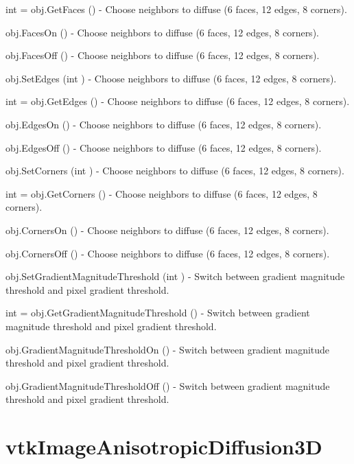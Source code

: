 \begin{DoxyItemize}
\item {\ttfamily int = obj.\-Get\-Faces ()} -\/ Choose neighbors to diffuse (6 faces, 12 edges, 8 corners).  
\item {\ttfamily obj.\-Faces\-On ()} -\/ Choose neighbors to diffuse (6 faces, 12 edges, 8 corners).  
\item {\ttfamily obj.\-Faces\-Off ()} -\/ Choose neighbors to diffuse (6 faces, 12 edges, 8 corners).  
\item {\ttfamily obj.\-Set\-Edges (int )} -\/ Choose neighbors to diffuse (6 faces, 12 edges, 8 corners).  
\item {\ttfamily int = obj.\-Get\-Edges ()} -\/ Choose neighbors to diffuse (6 faces, 12 edges, 8 corners).  
\item {\ttfamily obj.\-Edges\-On ()} -\/ Choose neighbors to diffuse (6 faces, 12 edges, 8 corners).  
\item {\ttfamily obj.\-Edges\-Off ()} -\/ Choose neighbors to diffuse (6 faces, 12 edges, 8 corners).  
\item {\ttfamily obj.\-Set\-Corners (int )} -\/ Choose neighbors to diffuse (6 faces, 12 edges, 8 corners).  
\item {\ttfamily int = obj.\-Get\-Corners ()} -\/ Choose neighbors to diffuse (6 faces, 12 edges, 8 corners).  
\item {\ttfamily obj.\-Corners\-On ()} -\/ Choose neighbors to diffuse (6 faces, 12 edges, 8 corners).  
\item {\ttfamily obj.\-Corners\-Off ()} -\/ Choose neighbors to diffuse (6 faces, 12 edges, 8 corners).  
\item {\ttfamily obj.\-Set\-Gradient\-Magnitude\-Threshold (int )} -\/ Switch between gradient magnitude threshold and pixel gradient threshold.  
\item {\ttfamily int = obj.\-Get\-Gradient\-Magnitude\-Threshold ()} -\/ Switch between gradient magnitude threshold and pixel gradient threshold.  
\item {\ttfamily obj.\-Gradient\-Magnitude\-Threshold\-On ()} -\/ Switch between gradient magnitude threshold and pixel gradient threshold.  
\item {\ttfamily obj.\-Gradient\-Magnitude\-Threshold\-Off ()} -\/ Switch between gradient magnitude threshold and pixel gradient threshold.  
\end{DoxyItemize}\hypertarget{vtkimaging_vtkimageanisotropicdiffusion3d}{}\section{vtk\-Image\-Anisotropic\-Diffusion3\-D}\label{vtkimaging_vtkimageanisotropicdiffusion3d}
